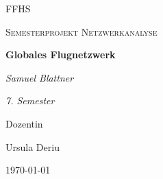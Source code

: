 \documentclass[11pt]{article}
\begin{document}
    \begin{titlepage}
        \centering

        {\scshape\LARGE FFHS \par}
        \vspace{1cm}
        {\scshape\Large Semesterprojekt Netzwerkanalyse \par}
        \vspace{1.5cm}
        {\huge\bfseries Globales Flugnetzwerk \par}
        \vspace{2cm}
        {\Large\itshape Samuel Blattner\par}

        {\itshape 7. Semester\par}
        \vfill
        Dozentin\par
        Ursula Deriu

        \vfill

        {\large \today\par}
    \end{titlepage}

    \pagebreak
    \setcounter{tocdepth}{2}
    \tableofcontents

    
    
    
    

    
    
\end{document}
